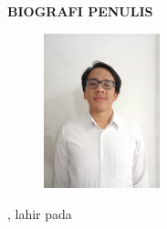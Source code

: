 \begin{center}
  \Large
  \textbf{BIOGRAFI PENULIS}
\end{center}


\vspace{2ex}

\begin{figure}
  \centering
  \vspace{-3ex}
  \includegraphics[width=0.3\textwidth]{gambar/John.jpeg}
  \vspace{-4ex}
\end{figure}

\name{}, lahir pada \lipsum[1]

\lipsum[2]
